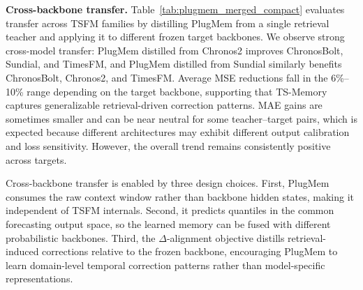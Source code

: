 



\noindent\textbf{Cross-backbone transfer.}
\label{sec:transfer_cross_backbone}
Table~\ref{tab:plugmem_merged_compact} evaluates transfer across TSFM families by distilling PlugMem from a single retrieval teacher and applying it to different frozen target backbones. We observe strong cross-model transfer: PlugMem distilled from Chronos2 improves ChronosBolt, Sundial, and TimesFM, and PlugMem distilled from Sundial similarly benefits ChronosBolt, Chronos2, and TimesFM. Average MSE reductions fall in the 6\%--10\% range depending on the target backbone, supporting that TS-Memory captures generalizable retrieval-driven correction patterns. MAE gains are sometimes smaller and can be near neutral for some teacher--target pairs, which is expected because different architectures may exhibit different output calibration and loss sensitivity. However, the overall trend remains consistently positive across targets. 

Cross-backbone transfer is enabled by three design choices. First, PlugMem consumes the raw context window rather than backbone hidden states, making it independent of TSFM internals. Second, it predicts quantiles in the common forecasting output space, so the learned memory can be fused with different probabilistic backbones. Third, the $\Delta$-alignment objective distills retrieval-induced corrections relative to the frozen backbone, encouraging PlugMem to learn domain-level temporal correction patterns rather than model-specific representations.






